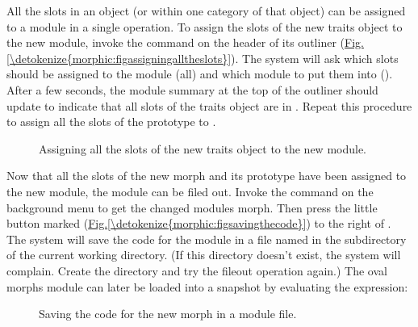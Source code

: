 \documentclass[letterpaper,10pt,english]{sphinxmanual}
\begin{document}
All the slots in an object (or within one category of that object) can be assigned to a module in a single operation. To assign the slots of the new traits object to the new module, invoke the  command on the header of its outliner (\hyperref[\detokenize{morphic:figassigningalltheslots}]{Fig.\@ \ref{\detokenize{morphic:figassigningalltheslots}}}). The system will ask which slots should be assigned to the module (all) and which module to put them into (). After a few seconds, the module summary at the top of the outliner should update to indicate that all slots of the traits object are in . Repeat this procedure to assign all the slots of the  prototype to .
\begin{figure}[htbp]
\centering
\capstart

\noindent{}
\caption{Assigning all the slots of the new traits object to the new module.}\label{\detokenize{morphic:figassigningalltheslots}}\label{\detokenize{morphic:id14}}\end{figure}

Now that all the slots of the new morph and its prototype have been assigned to the new module, the module can be filed out. Invoke the  command on the background menu to get the changed modules morph. Then press the little button marked \sphinxquotedblleft{}\sphinxquotedblright{} (\hyperref[\detokenize{morphic:figsavingthecode}]{Fig.\@ \ref{\detokenize{morphic:figsavingthecode}}}) to the right of . The system will save the code for the module in a file named \sphinxquotedblleft{}\sphinxquotedblright{} in the \sphinxquotedblleft{}\sphinxquotedblright{} subdirectory of the current working directory. (If this directory doesn't exist, the system will complain. Create the directory and try the fileout operation again.) The oval morphs module can later be loaded into a snapshot by evaluating the expression:

\begin{sphinxVerbatim}[commandchars=\\\{\}]
    
\end{sphinxVerbatim}
\begin{figure}[htbp]
\centering
\capstart

\noindent{}
\caption{Saving the code for the new morph in a module file.}\label{\detokenize{morphic:figsavingthecode}}\label{\detokenize{morphic:id15}}\end{figure}
\end{document}
